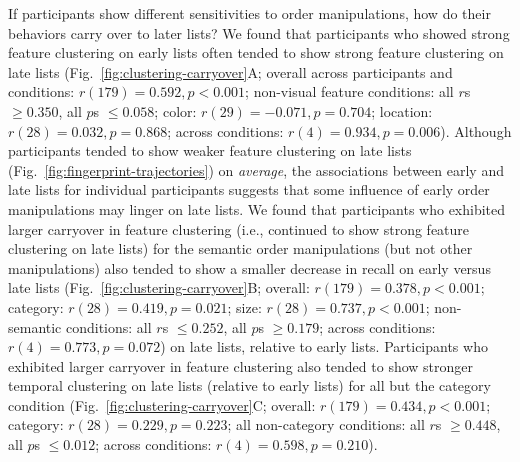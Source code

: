 \documentclass[11pt]{article}
\begin{document}
If participants show different sensitivities to order manipulations, how do
their behaviors carry over to later lists? We found that participants who
showed strong feature clustering on early lists often tended to show strong
feature clustering on late lists (Fig.~\ref{fig:clustering-carryover}A; overall
across participants and conditions: $r(179) = 0.592, p < 0.001$; non-visual
feature conditions: all $r$s $\geq 0.350$, all $p$s $\leq 0.058$; color: $r(29)
= -0.071, p = 0.704$; location: $r(28) = 0.032, p = 0.868$; across conditions:
$r(4) = 0.934, p = 0.006$). Although participants tended to show weaker feature
clustering on late lists (Fig.~\ref{fig:fingerprint-trajectories}) on
\textit{average}, the associations between early and late lists for individual
participants suggests that some influence of early order manipulations may
linger on late lists. We found that participants who exhibited larger carryover
in feature clustering (i.e., continued to show strong feature clustering on
late lists) for the semantic order manipulations (but not other manipulations)
also tended to show a smaller decrease in recall on early versus late lists
(Fig.~\ref{fig:clustering-carryover}B; overall: $r(179) = 0.378, p < 0.001$;
category: $r(28) = 0.419, p = 0.021$; size: $r(28) = 0.737, p < 0.001$;
non-semantic conditions: all $r$s $\leq 0.252$, all $p$s $\geq 0.179$; across
conditions: $r(4) = 0.773, p = 0.072$) on late lists, relative to early lists.
Participants who exhibited larger carryover in feature clustering also tended
to show stronger temporal clustering on late lists (relative to early lists)
for all but the category condition (Fig.~\ref{fig:clustering-carryover}C;
overall: $r(179) = 0.434, p < 0.001$; category: $r(28) = 0.229, p = 0.223$; all
non-category conditions: all $r$s $\geq 0.448$, all $p$s $\leq 0.012$; across
conditions: $r(4) = 0.598, p = 0.210$).
\end{document}
